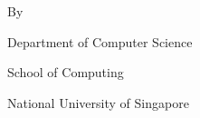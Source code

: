 \begin{titlepage}
    \centering
    {\large \projecttype}
    \vfill
    {\LARGE\bfseries \projecttitle\par}
    \vspace{2cm}
    {\large By\par \authorname}
    \vfill
    Department of Computer Science\par
    School of Computing\par
    National University of Singapore\par
    \vspace{1cm}
    {\normalsize \academicyear\par}
\end{titlepage}
\restoregeometry
\pagebreak
